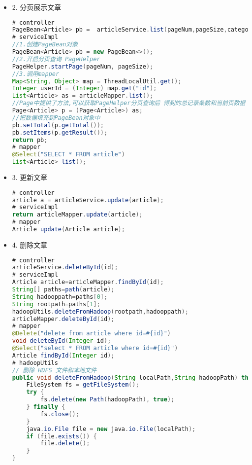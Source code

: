 \documentclass[bachelor]{thesis-uestc}
\begin{document}
\begin{itemize}
\item 2. 分页展示文章
\begin{lstlisting}[language=Java]
# controller
PageBean<Article> pb =  articleService.list(pageNum,pageSize,categoryId,state);
# serviceImpl
//1.创建PageBean对象
PageBean<Article> pb = new PageBean<>();
//2.开启分页查询 PageHelper
PageHelper.startPage(pageNum, pageSize);
//3.调用mapper
Map<String, Object> map = ThreadLocalUtil.get();
Integer userId = (Integer) map.get("id");
List<Article> as = articleMapper.list();
//Page中提供了方法,可以获取PageHelper分页查询后 得到的总记录条数和当前页数据
Page<Article> p = (Page<Article>) as;
//把数据填充到PageBean对象中
pb.setTotal(p.getTotal());
pb.setItems(p.getResult());
return pb;
# mapper
@Select("SELECT * FROM article")
List<Article> list();
\end{lstlisting}



\item 3. 更新文章
\begin{lstlisting}[language=Java]
# controller
article a = articleService.update(article);
# serviceImpl
return articleMapper.update(article);
# mapper
Article update(Article article);
\end{lstlisting}


\item 4. 删除文章
\begin{lstlisting}[language=Java]
# controller
articleService.deleteById(id);
# serviceImpl
Article article=articleMapper.findById(id);
String[] paths=path(article);
String hadooppath=paths[0];
String rootpath=paths[1];
hadoopUtils.deleteFromHadoop(rootpath,hadooppath);
articleMapper.deleteById(id);
# mapper
@Delete("delete from article where id=#{id}")
void deleteById(Integer id);
@Select("select * FROM article where id=#{id}")
Article findById(Integer id);
# hadoopUtils
// 删除 HDFS 文件和本地文件
public void deleteFromHadoop(String localPath,String hadoopPath) throws Exception {
    FileSystem fs = getFileSystem();
    try {
        fs.delete(new Path(hadoopPath), true);
    } finally {
        fs.close();
    }
    java.io.File file = new java.io.File(localPath);
    if (file.exists()) {
        file.delete();
    }
}
\end{lstlisting}

\end{itemize}
\end{document}
